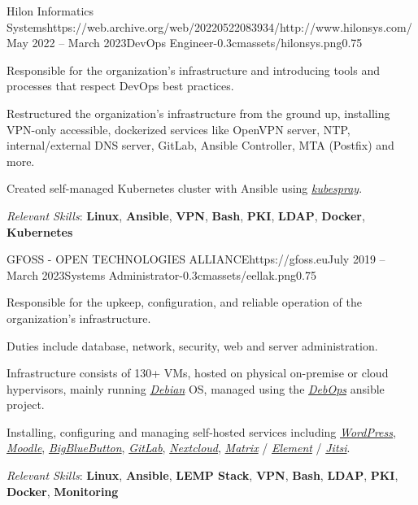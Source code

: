 \documentclass{mycv}
\begin{document}
	\begin{EntryDatedLogo}{Hilon Informatics Systems}{https://web.archive.org/web/20220522083934/http://www.hilonsys.com/}{May 2022 -- March 2023}{DevOps Engineer}{-0.3cm}{assets/hilonsys.png}{0.75}
		\vspace{-0.2cm}
		\begin{Itemize}
			\item Responsible for the organization's infrastructure and introducing tools and processes that respect DevOps best practices.
   \item Restructured the organization's infrastructure from the ground up, installing VPN-only accessible, dockerized services like OpenVPN server, NTP, internal/external DNS server, GitLab, Ansible Controller, MTA (Postfix) and more.
   \item Created self-managed Kubernetes cluster with Ansible using 
\href{https://kubespray.io/}{\textit{kubespray}}.
   \item \textit{Relevant Skills}: \textbf{Linux}, \textbf{Ansible}, \textbf{VPN}, \textbf{Bash}, \textbf{PKI}, \textbf{LDAP}, \textbf{Docker}, \textbf{Kubernetes} 
		\end{Itemize}
	\end{EntryDatedLogo}

	\vspace{0.75cm}

	\begin{EntryDatedLogo}{GFOSS - OPEN TECHNOLOGIES ALLIANCE}{https://gfoss.eu}{July 2019 -- March 2023}{Systems Administrator}{-0.3cm}{assets/eellak.png}{0.75}
		\vspace{-0.2cm}
		\begin{Itemize}
			\item Responsible for the upkeep, configuration, and reliable operation of the organization's infrastructure.
			\item Duties include database, network, security, web and server administration.
			\item Infrastructure consists of 130+ VMs, hosted on physical on-premise or cloud hypervisors, mainly running \href{https://www.debian.org}{\textit{Debian}} OS, managed using the \href{https://debops.org}{\textit{DebOps}} ansible project.
			\item Installing, configuring and managing self-hosted services including \href{https://wordpress.com}{\textit{WordPress}}, \href{https://moodle.org}{\textit{Moodle}}, \href{https://bigbluebutton.org}{\textit{BigBlueButton}}, \href{https://about.gitlab.com/install/}{\textit{GitLab}}, \href{https://nextcloud.com}{\textit{Nextcloud}}, \href{https://matrix.org}{\textit{Matrix}} / \href{https://element.io}{\textit{Element}} / \href{https://jitsi.org}{\textit{Jitsi}}.
    \item \textit{Relevant Skills}: \textbf{Linux}, \textbf{Ansible}, \textbf{LEMP Stack}, \textbf{VPN}, \textbf{Bash}, \textbf{LDAP}, \textbf{PKI}, \textbf{Docker}, \textbf{Monitoring}
  \end{Itemize}
	\end{EntryDatedLogo}
\end{document}
